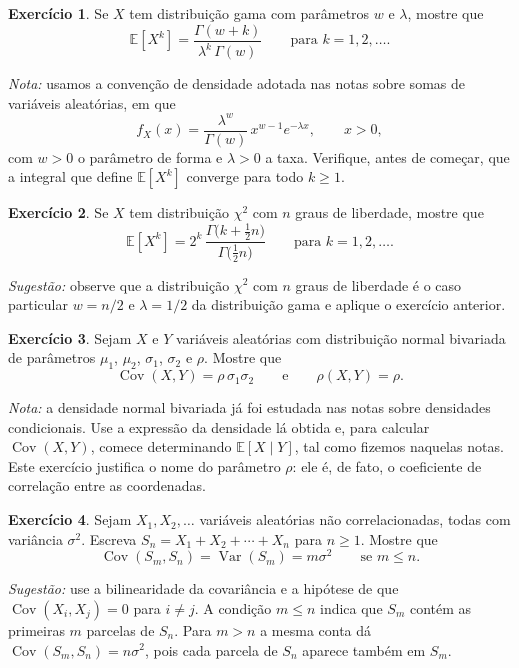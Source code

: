 \documentclass[12pt,portuguese]{article}
\theoremstyle{definition}
\theoremstyle{plainexercise}
\newtheorem{exercise}{Exercício}
\theoremstyle{starredexercise}
\newtheorem{starredexercise}[exercise]{Exercício}
\theoremstyle{definition}
\begin{document}
\begin{exercise}\label{exercise:gw-7-11}
  Se $X$ tem distribuição gama com parâmetros $w$ e $\lambda$, mostre que
  \[
    \mathbb{E}[X^k] = \frac{\Gamma(w+k)}{\lambda^k\,\Gamma(w)}
    \qquad \text{para } k = 1, 2, \ldots.
  \]

  \noindent\emph{Nota:} usamos a convenção de densidade adotada nas notas sobre somas de
  variáveis aleatórias, em que
  \[
    f_X(x) = \frac{\lambda^w}{\Gamma(w)}\,x^{w-1}e^{-\lambda x},
    \qquad x > 0,
  \]
  com $w>0$ o parâmetro de forma e $\lambda>0$ a taxa. Verifique, antes de
  começar, que a integral que define $\mathbb{E}[X^k]$ converge para todo
  $k\geqslant 1$.
\end{exercise}

\begin{exercise}\label{exercise:gw-7-12}
  Se $X$ tem distribuição $\chi^2$ com $n$ graus de liberdade, mostre que
  \[
    \mathbb{E}[X^k] = 2^k\,\frac{\Gamma\bigl(k + \tfrac{1}{2}n\bigr)}
    {\Gamma\bigl(\tfrac{1}{2}n\bigr)}
    \qquad \text{para } k = 1, 2, \ldots.
  \]

  \noindent\emph{Sugestão:} observe que a distribuição $\chi^2$ com $n$ graus de
  liberdade é o caso particular $w = n/2$ e $\lambda = 1/2$ da distribuição
  gama e aplique o exercício anterior.
\end{exercise}


\begin{starredexercise}\label{exercise:gw-7-35}
  Sejam $X$ e $Y$ variáveis aleatórias com distribuição normal bivariada de
  parâmetros $\mu_1$, $\mu_2$, $\sigma_1$, $\sigma_2$ e $\rho$. Mostre que
  \[
    \operatorname{Cov}(X,Y) = \rho\,\sigma_1\sigma_2
    \qquad \text{e} \qquad
    \rho(X,Y) = \rho.
  \]

  \noindent\emph{Nota:} a densidade normal bivariada já foi estudada nas notas sobre
  densidades condicionais. Use a expressão da densidade lá obtida e, para
  calcular $\operatorname{Cov}(X,Y)$, comece determinando
  $\mathbb{E}[X\mid Y]$, tal como fizemos naquelas notas. Este exercício
  justifica o nome do parâmetro $\rho$: ele é, de fato, o coeficiente de
  correlação entre as coordenadas.
\end{starredexercise}

\begin{exercise}\label{exercise:gw-7-36}
  Sejam $X_1, X_2, \ldots$ variáveis aleatórias não correlacionadas, todas com
  variância $\sigma^2$. Escreva $S_n = X_1 + X_2 + \cdots + X_n$ para
  $n\geqslant 1$. Mostre que
  \[
    \operatorname{Cov}(S_m, S_n) = \operatorname{Var}(S_m) = m\sigma^2
    \qquad \text{se } m \leqslant n.
  \]

  \noindent\emph{Sugestão:} use a bilinearidade da covariância e a hipótese de que
  $\operatorname{Cov}(X_i,X_j) = 0$ para $i\neq j$. A condição $m\leqslant n$
  indica que $S_m$ contém as primeiras $m$ parcelas de $S_n$. Para
  $m>n$ a mesma conta dá $\operatorname{Cov}(S_m,S_n) = n\sigma^2$, pois cada
  parcela de $S_n$ aparece também em $S_m$.
\end{exercise}
\end{document}
